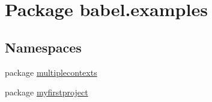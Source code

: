 \hypertarget{namespacebabel_1_1examples}{\section{Package babel.\-examples}
\label{namespacebabel_1_1examples}
}
\subsection*{Namespaces}
\begin{DoxyCompactItemize}
\item 
package \hyperlink{namespacebabel_1_1examples_1_1multiplecontexts}{multiplecontexts}
\item 
package \hyperlink{namespacebabel_1_1examples_1_1myfirstproject}{myfirstproject}
\end{DoxyCompactItemize}
